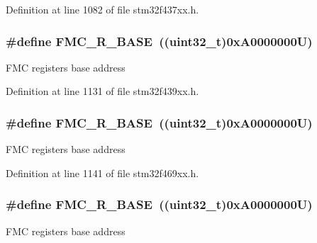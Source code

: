 Definition at line 1082 of file stm32f437xx.\+h.

\subsubsection[{\texorpdfstring{F\+M\+C\+\_\+\+R\+\_\+\+B\+A\+SE}{FMC_R_BASE}}]{\setlength{\rightskip}{0pt plus 5cm}\#define F\+M\+C\+\_\+\+R\+\_\+\+B\+A\+SE~((uint32\+\_\+t)0x\+A0000000\+U)}\hypertarget{group___peripheral__memory__map_ga7a599164cd92798542bc6288793d1ed5}{}\label{group___peripheral__memory__map_ga7a599164cd92798542bc6288793d1ed5}
F\+MC registers base address 

Definition at line 1131 of file stm32f439xx.\+h.

\subsubsection[{\texorpdfstring{F\+M\+C\+\_\+\+R\+\_\+\+B\+A\+SE}{FMC_R_BASE}}]{\setlength{\rightskip}{0pt plus 5cm}\#define F\+M\+C\+\_\+\+R\+\_\+\+B\+A\+SE~((uint32\+\_\+t)0x\+A0000000\+U)}\hypertarget{group___peripheral__memory__map_ga7a599164cd92798542bc6288793d1ed5}{}\label{group___peripheral__memory__map_ga7a599164cd92798542bc6288793d1ed5}
F\+MC registers base address 

Definition at line 1141 of file stm32f469xx.\+h.

\subsubsection[{\texorpdfstring{F\+M\+C\+\_\+\+R\+\_\+\+B\+A\+SE}{FMC_R_BASE}}]{\setlength{\rightskip}{0pt plus 5cm}\#define F\+M\+C\+\_\+\+R\+\_\+\+B\+A\+SE~((uint32\+\_\+t)0x\+A0000000\+U)}\hypertarget{group___peripheral__memory__map_ga7a599164cd92798542bc6288793d1ed5}{}\label{group___peripheral__memory__map_ga7a599164cd92798542bc6288793d1ed5}
F\+MC registers base address 

